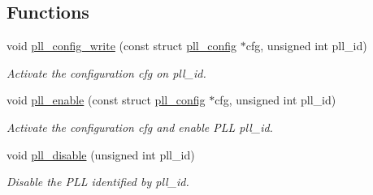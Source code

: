 \subsection*{\-Functions}
\begin{DoxyCompactItemize}
\item 
void \hyperlink{group__pll__group_gaeee0be729bfa596c973cf6f725a89d45}{pll\-\_\-config\-\_\-write} (const struct \hyperlink{structpll__config}{pll\-\_\-config} $\ast$cfg, unsigned int pll\-\_\-id)
\begin{DoxyCompactList}\small\item\em \-Activate the configuration {\itshape cfg\/} on {\itshape pll\-\_\-id\/}. \end{DoxyCompactList}\item 
void \hyperlink{group__pll__group_gaede6e280289cb0759af0f5a34f5a627f}{pll\-\_\-enable} (const struct \hyperlink{structpll__config}{pll\-\_\-config} $\ast$cfg, unsigned int pll\-\_\-id)
\begin{DoxyCompactList}\small\item\em \-Activate the configuration {\itshape cfg\/} and enable \-P\-L\-L {\itshape pll\-\_\-id\/}. \end{DoxyCompactList}\item 
void \hyperlink{group__pll__group_ga9b369b5f673b10a6adf14cd3c9fea5ad}{pll\-\_\-disable} (unsigned int pll\-\_\-id)
\begin{DoxyCompactList}\small\item\em \-Disable the \-P\-L\-L identified by {\itshape pll\-\_\-id\/}. \end{DoxyCompactList}\end{DoxyCompactItemize}
